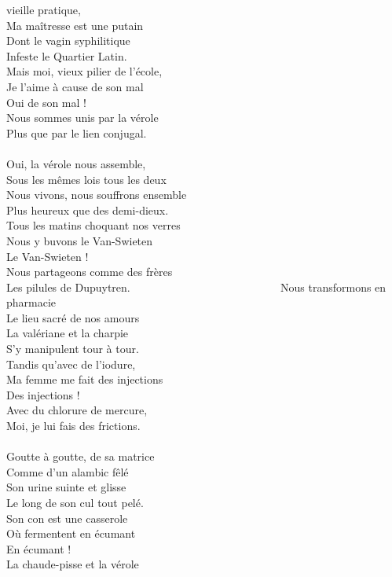  vieille pratique,
\\Ma maîtresse est une putain
\\Dont le vagin syphilitique
\\Infeste le Quartier Latin.
\\Mais moi, vieux pilier de l'école,
\\Je l'aime à cause de son mal
\\Oui de son mal !
\\Nous sommes unis par la vérole
\\Plus que par le lien conjugal. ~~~~~~~~~~~~~~~~~~~~~\bissimple
\\\\Oui, la vérole nous assemble,
\\Sous les mêmes lois tous les deux
\\Nous vivons, nous souffrons ensemble
\\Plus heureux que des demi-dieux.
\\Tous les matins choquant nos verres
\\Nous y buvons le Van-Swieten
\\Le Van-Swieten !
\\Nous partageons comme des frères
\\Les pilules de Dupuytren. ~~~~~~~~~~~~~~~~~~~~~~~~~~\bissimple
\breakpage
Nous transformons en pharmacie
\\Le lieu sacré de nos amours
\\La valériane et la charpie
\\S'y manipulent tour à tour.
\\Tandis qu'avec de l'iodure,
\\Ma femme me fait des injections
\\Des injections !
\\Avec du chlorure de mercure,
\\Moi, je lui fais des frictions. ~~~~~~~~~~~~~~~~~~~~~~~\bissimple
\\\\Goutte à goutte, de sa matrice
\\Comme d'un alambic fêlé
\\Son urine suinte et glisse
\\Le long de son cul tout pelé.
\\Son con est une casserole
\\Où fermentent en écumant
\\En écumant !
\\La chaude-pisse et la vérole
